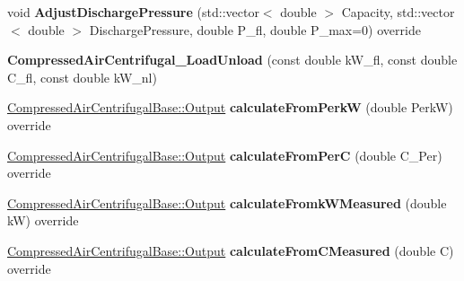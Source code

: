 \begin{DoxyCompactItemize}
\item 
\mbox{\label{class_compressed_air_centrifugal___load_unload_a7ba88b9798eeff1a022d5a9630884d56}} 
void {\bfseries Adjust\+Discharge\+Pressure} (std\+::vector$<$ double $>$ Capacity, std\+::vector$<$ double $>$ Discharge\+Pressure, double P\+\_\+fl, double P\+\_\+max=0) override
\item 
\mbox{\label{class_compressed_air_centrifugal___load_unload_ad01a5b7853ae89956c664669c8baf326}} 
{\bfseries Compressed\+Air\+Centrifugal\+\_\+\+Load\+Unload} (const double k\+W\+\_\+fl, const double C\+\_\+fl, const double k\+W\+\_\+nl)
\item 
\mbox{\label{class_compressed_air_centrifugal___load_unload_a05415e81aec9dca3bc85b7e354225ff7}} 
\hyperlink{struct_compressed_air_centrifugal_base_1_1_output}{Compressed\+Air\+Centrifugal\+Base\+::\+Output} {\bfseries calculate\+From\+PerkW} (double PerkW) override
\item 
\mbox{\label{class_compressed_air_centrifugal___load_unload_a02cd64d091bca0721f22b9f9926bdde3}} 
\hyperlink{struct_compressed_air_centrifugal_base_1_1_output}{Compressed\+Air\+Centrifugal\+Base\+::\+Output} {\bfseries calculate\+From\+PerC} (double C\+\_\+\+Per) override
\item 
\mbox{\label{class_compressed_air_centrifugal___load_unload_a3b01f59fff4823fb2a488d0f2258579f}} 
\hyperlink{struct_compressed_air_centrifugal_base_1_1_output}{Compressed\+Air\+Centrifugal\+Base\+::\+Output} {\bfseries calculate\+Fromk\+W\+Measured} (double kW) override
\item 
\mbox{\label{class_compressed_air_centrifugal___load_unload_aa85616d72a1b86e19fc86b4c777aa8ec}} 
\hyperlink{struct_compressed_air_centrifugal_base_1_1_output}{Compressed\+Air\+Centrifugal\+Base\+::\+Output} {\bfseries calculate\+From\+C\+Measured} (double C) override
\item 
\mbox{\label{class_compressed_air_centrifugal___load_unload_adb9a3b48125a7a5e95e6b433d3fe0c96}} 

\end{DoxyCompactItemize}
